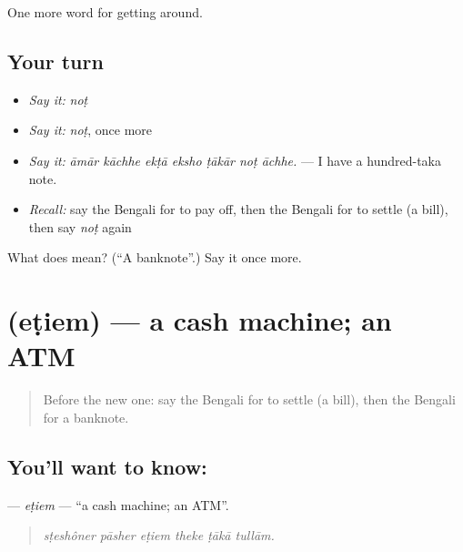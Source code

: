 \begin{grammarlens}[title={What you've built}]
One more word for getting around.
\end{grammarlens}

\subsection*{Your turn}
\begin{itemize}
\raggedright
  \item \emph{Say it:} \emph{noṭ}
  \item \emph{Say it:} \emph{noṭ}, once more
  \item \emph{Say it:} \emph{āmār kāchhe ekṭā eksho ṭākār noṭ āchhe.} — I have a hundred-taka note.
  \item \emph{Recall:} say the Bengali for to pay off, then the Bengali for to settle (a bill), then say \emph{noṭ} again
\end{itemize}

\begin{tcolorbox}[breakable,colback=teal!4,colframe=teal!35!black,title={Before you move on}]
What does  mean? (\textquotedblleft{}A banknote\textquotedblright{}.) Say it once more.
\end{tcolorbox}
\section[\texorpdfstring{\bn{এটিএম} (eṭiem)}{এটিএম (eṭiem)}]{ (eṭiem) — a cash machine; an ATM}

\label{lesson:BN-C417-etiem}



\begin{quote}
Before the new one: say the Bengali for to settle (a bill), then the Bengali for a banknote.
\end{quote}

\subsection*{You'll want to know: }
\textbf{} — \emph{eṭiem} — \textquotedblleft{}a cash machine; an ATM\textquotedblright{}.

\begin{quote}
     
\end{quote}

\begin{quote}
\emph{sṭeshôner pāsher eṭiem theke ṭākā tullām.}
\end{quote}

